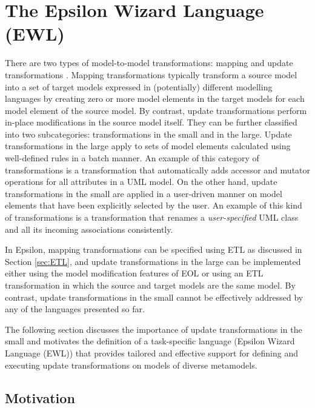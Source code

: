 \chapter{The Epsilon Wizard Language (EWL)}
\label{sec:EWL}

There are two types of model-to-model transformations: mapping and update transformations \cite{Czarnecki2003}. Mapping transformations typically transform a source model into a set of target models expressed in (potentially) different modelling languages by creating zero or more model elements in the target models for each model element of the source model. By contrast, update transformations perform in-place modifications in the source model itself. They can be further classified into two subcategories: transformations in the small and in the large. Update transformations in the large apply to sets of model elements calculated using well-defined rules in a batch manner. An example of this category of transformations is a transformation that automatically adds accessor and mutator operations for all attributes in a UML model. On the other hand, update transformations in the small are applied in a user-driven manner on model elements that have been explicitly selected by the user. An example of this kind of transformations is a transformation that renames a \emph{user-specified} UML class and all its incoming associations consistently.

In Epsilon, mapping transformations can be specified using ETL as discussed in Section \ref{sec:ETL}, and update transformations in the large can be implemented either using the model modification features of EOL or using an ETL transformation in which the source and target models are the same model. By contrast, update transformations in the small cannot be effectively addressed by any of the languages presented so far.

The following section discusses the importance of update transformations in the small and motivates the definition of a task-specific language (Epsilon Wizard Language (EWL)) that provides tailored and effective support for defining and executing update transformations on models of diverse metamodels.

\section{Motivation}
\label{sec:EwlMotivation}

